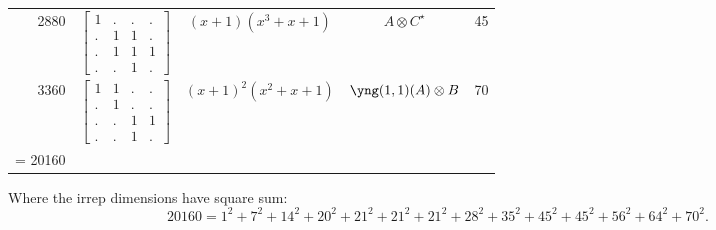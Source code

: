 \documentclass[11pt,oneside]{article}
\newcommand{\tensor}{\otimes}
\begin{document}
\begin{center}
\begin{tabular}{r|l|c|c|c}
2880  & $\begin{bmatrix}1&.&.&.\\.&1&1&.\\.&1&1&1\\.&.&1&.\end{bmatrix}$
  & $(x+1)(x^3+x+1)$  & $A\tensor C^{\star}$ & 45   \\
3360  & $\begin{bmatrix}1&1&.&.\\.&1&.&.\\.&.&1&1\\.&.&1&.\end{bmatrix}$  & $(x+1)^2(x^2+x+1)$  & $\yng(1,1)(A)\tensor B$ & 70 \\
\hline
\strut = 20160 \\
\end{tabular}
\end{center}
Where the irrep dimensions have square sum:
$$
 20160 = 1^2 + 7^2 + 14^2 + 20^2 + 21^2 + 21^2 + 21^2 + 28^2 + 35^2 + 45^2 + 45^2 + 56^2 + 64^2 + 70^2.
$$
\end{document}
